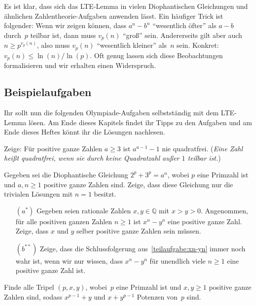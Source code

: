 Es ist klar, dass sich das LTE-Lemma in vielen Diophantischen Gleichungen und ähnlichen Zahlentheorie-Aufgaben anwenden lässt. Ein häufiger Trick ist folgender: Wenn wir zeigen können, dass $a^n-b^n$ \enquote{wesentlich öfter} als $a-b$ durch~$p$ teilbar ist, dann muss $v_p(n)$ \enquote{groß} sein. Andererseits gilt aber auch $n\geqslant p^{v_p(n)}$, also muss $v_p(n)$ \enquote{wesentlich kleiner} als~$n$ sein. Konkret: $v_p(n)\leqslant \ln(n)/\ln(p)$. Oft genug lassen sich diese Beobachtungen formalisieren und wir erhalten einen Widerspruch.

\subsection*{Beispielaufgaben}
Ihr sollt nun die folgenden Olympiade-Aufgaben selbstständig mit dem LTE-Lemma lösen. Am Ende dieses Kapitels findet ihr Tipps zu den Aufgaben und am Ende dieses Heftes könnt ihr die Lösungen nachlesen.

\begin{aufgabe*}\label{aufgabe:NieQuadratfrei}
	Zeige: Für positive ganze Zahlen $a\geqslant 3$ ist $a^{a-1}-1$ nie quadratfrei. (\emph{Eine Zahl heißt quadratfrei, wenn sie durch keine Quadratzahl außer $1$ teilbar ist.})
\end{aufgabe*}
\begin{aufgabe*}\label{aufgabe:2p3pan}
	Gegeben sei die Diophantische Gleichung $2^p+3^p=a^n$, wobei $p$ eine Primzahl ist und $a,n\geqslant 1$ positive ganze Zahlen sind. Zeige, dass diese Gleichung nur die trivialen Lösungen mit $n=1$ besitzt.
\end{aufgabe*}
\begin{aufgabe*}[**]\leavevmode\label{aufgabe:xn-yn}
	\begin{enumerate}[label={$(\alph*)$},ref={$(\alph*)$}]
		\item[$(a^*)$] Gegeben seien rationale Zahlen $x,y\in\mathbb Q$ mit $x>y>0$. Angenommen, für alle positiven ganzen Zahlen $n\geqslant 1$ ist $x^n-y^n$ eine positive ganze Zahl. Zeige, dass $x$ und $y$ selber positive ganze Zahlen sein müssen.\label{teilaufgabe:xn-yn}
		\item[$(b^{**})$] Zeige, dass die Schlussfolgerung aus~\ref{teilaufgabe:xn-yn} immer noch wahr ist, wenn wir nur wissen, dass $x^n-y^n$ für unendlich viele $n\geqslant 1$ eine positive ganze Zahl ist.\label{teilaufgabe:xn-ynEndlichViele}
	\end{enumerate}
\end{aufgabe*}
\begin{aufgabe*}[**]\label{aufgabe:IMOSL2014N5}
	Finde alle Tripel $(p,x,y)$, wobei~$p$ eine Primzahl ist und $x,y\geqslant 1$ positive ganze Zahlen sind, sodass $x^{p-1}+y$ und $x+y^{p-1}$ Potenzen von~$p$ sind.
\end{aufgabe*}


